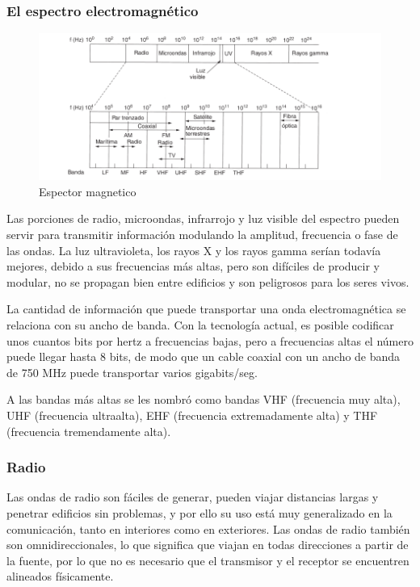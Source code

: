 \subsubsection*{El espectro electromagnético}
\begin{figure}[H]
	\centering
	\includegraphics[width=\textwidth
]{images/espectro-magnetico.png}
	\caption[Espector magnetico]{Espector magnetico}
	\label{fig:espectro-magnetico}
\end{figure}

Las porciones de radio, microondas, infrarrojo y luz visible del espectro pueden servir para transmitir información modulando la amplitud, frecuencia o fase de las ondas. La luz ultravioleta, los rayos X y los rayos gamma serían todavía mejores, debido a sus frecuencias más altas, pero son difíciles de producir y modular, no se propagan bien entre edificios y son peligrosos para los seres vivos. 

La cantidad de información que puede transportar una onda electromagnética se relaciona con su ancho de banda. Con la tecnología actual, es posible codificar unos cuantos bits por hertz a frecuencias bajas, pero a frecuencias altas el número puede llegar hasta 8 bits, de modo que un cable coaxial con un ancho de banda de 750 MHz puede transportar varios gigabits/seg.

A las bandas más altas se les nombró como bandas VHF (frecuencia muy alta), UHF (frecuencia ultraalta), EHF (frecuencia extremadamente alta) y THF (frecuencia tremendamente alta).

\subsubsection*{Radio}
Las ondas de radio son fáciles de generar, pueden viajar distancias largas y penetrar edificios sin problemas, y por ello su uso está muy generalizado en la comunicación, tanto en interiores como en exteriores. Las ondas de radio también son  omnidireccionales, lo que significa que viajan en todas direcciones a partir de la fuente, por lo que no es necesario que el transmisor y el receptor se encuentren alineados físicamente.

